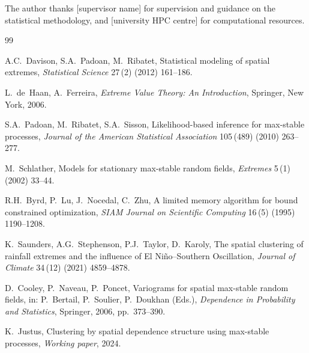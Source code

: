 \documentclass[a4paper]{elsarticle}
\begin{document}
The author thanks [supervisor name] for supervision and guidance on the
statistical methodology, and [university HPC centre] for computational
resources.

\begin{thebibliography}{99}

A.C.~Davison, S.A.~Padoan, M.~Ribatet,
Statistical modeling of spatial extremes,
\textit{Statistical Science} 27\,(2) (2012) 161--186.

L.~de~Haan, A.~Ferreira,
\textit{Extreme Value Theory: An Introduction},
Springer, New York, 2006.

S.A.~Padoan, M.~Ribatet, S.A.~Sisson,
Likelihood-based inference for max-stable processes,
\textit{Journal of the American Statistical Association}
105\,(489) (2010) 263--277.

M.~Schlather,
Models for stationary max-stable random fields,
\textit{Extremes} 5\,(1) (2002) 33--44.

R.H.~Byrd, P.~Lu, J.~Nocedal, C.~Zhu,
A limited memory algorithm for bound constrained optimization,
\textit{SIAM Journal on Scientific Computing}
16\,(5) (1995) 1190--1208.

K.~Saunders, A.G.~Stephenson, P.J.~Taylor, D.~Karoly,
The spatial clustering of rainfall extremes and the influence of
El Ni\~{n}o--Southern Oscillation,
\textit{Journal of Climate} 34\,(12) (2021) 4859--4878.

D.~Cooley, P.~Naveau, P.~Poncet,
Variograms for spatial max-stable random fields,
in: P.~Bertail, P.~Soulier, P.~Doukhan (Eds.),
\textit{Dependence in Probability and Statistics},
Springer, 2006, pp.~373--390.

K.~Justus,
Clustering by spatial dependence structure using max-stable processes,
\textit{Working paper}, 2024.

\end{thebibliography}
\end{document}
